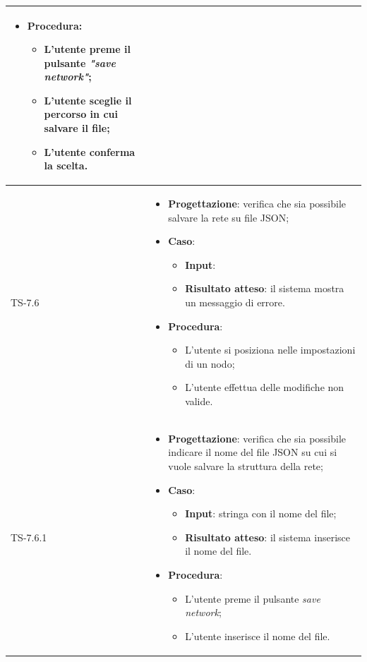 \begin{longtable}{|C{2.5cm}|C{13cm}|}
\begin{itemize}
\begin{itemize}
	\end{itemize}
	\item \textbf{Procedura}:
	\begin{itemize}
		\item L'utente preme il pulsante \emph{"save network"};
		\item L'utente sceglie il percorso in cui salvare il file;
		\item L'utente conferma la scelta.
	\end{itemize} 
\end{itemize} \\
\hline
	{TS-7.6} & 
\begin{itemize}
	\item \textbf{Progettazione}: verifica che sia possibile salvare la rete su
	file JSON;
	\item \textbf{Caso}: 
	\begin{itemize}
		\item \textbf{Input}:
		\item \textbf{Risultato atteso}: il sistema mostra un messaggio di errore.
	\end{itemize}
	\item \textbf{Procedura}:
	\begin{itemize}
		\item L'utente si posiziona nelle impostazioni di un nodo;
		\item L'utente effettua delle modifiche non valide.
	\end{itemize} 
\end{itemize} \\
\hline
	{TS-7.6.1} & 
\begin{itemize}
	\item \textbf{Progettazione}: verifica che sia possibile indicare il nome
	del file JSON su cui si vuole salvare la struttura della rete;
	\item \textbf{Caso}: 
	\begin{itemize}
		\item \textbf{Input}: stringa con il nome del file;
		\item \textbf{Risultato atteso}: il  sistema inserisce il nome del file.
	\end{itemize}
	\item \textbf{Procedura}:
	\begin{itemize}
		\item L'utente preme il pulsante \emph{save network};
		\item L'utente inserisce il nome del file.
	\end{itemize} 

\end{itemize}
\end{longtable}
